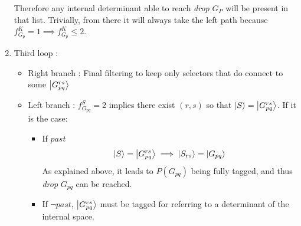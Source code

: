 \documentclass[./thesis.tex]{subfiles}
\begin{document}
\begin{enumerate}
Therefore any internal determinant able to reach \emph{drop} $G_P$ will be present in that list. Trivially, from there it will always take the left path because $f^K_{G_{p}} = 1 \implies f^K_{G_{p}} \leq 2$.


\item
Third loop :
\begin{itemize}

\item
Right branch :
Final filtering to keep only selectors that do connect to some $\ket{G^{rs}_{pq}}$
\item
Left branch : $f_{G_{pq}}^S = 2$ implies there exist $(r,s)$ so that $\ket S=\ket{G^{rs}_{pq}}$. If it is the case:
\begin{itemize}
\item
If $past$
\begin{equation}
\ket S=\ket {G_{pq}^{rs}} \implies \ket {S_{rs}} = \ket {G_{pq}}
\end{equation}
As explained above, it leads to $P(G_{pq})$ being fully tagged, and thus \emph{drop} $G_{pq}$ can be reached.
\item
If $\neg past$, $\ket {G_{pq}^{rs}}$ must be tagged for referring to a determinant of the internal space.
\end{itemize}



\end{itemize}

\end{enumerate}



\newcommand{\Gpq}{\ket {G_{pq}}}
\newcommand{\Gpbq}{\ket {G_{p \bar q}}}
\end{document}
